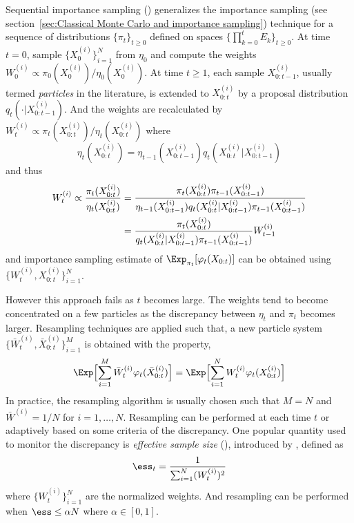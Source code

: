 Sequential importance sampling (\sis) generalizes the importance sampling (see
section~\ref{sec:Classical Monte Carlo and importance sampling}) technique for
a sequence of distributions $\{\pi_t\}_{t\ge0}$ defined on spaces
$\{\prod_{k=0}^tE_k\}_{t\ge0}$. At time $t = 0$, sample
$\{X_0^{(i)}\}_{i=1}^N$ from $\eta_0$ and compute the weights $W_0^{(i)}
\propto \pi_0(X_0^{(i)})/\eta_0(X_0^{(i)})$. At time $t\ge1$, each sample
$X_{0:t-1}^{(i)}$, usually termed \emph{particles} in the literature, is
extended to $X_{0:t}^{(i)}$ by a proposal distribution
$q_t(\cdot|X_{0:t-1}^{(i)})$. And the weights are recalculated by $W_t^{(i)}
\propto \pi_t(X_{0:t}^{(i)})/\eta_t(X_{0:t}^{(i)})$ where
\begin{equation}
  \eta_t(X_{0:t}^{(i)}) =
  \eta_{t-1}(X_{0:t-1}^{(i)})q_t(X_{0:t}^{(i)}|X_{0:t-1}^{(i)})
\end{equation}
and thus
\begin{align}
  W_t^{(i)} \propto \frac{\pi_t(X_{0:t}^{(i)})}{\eta_t(X_{0:t}^{(i)})}
  &= \frac{\pi_t(X_{0:t}^{(i)})\pi_{t-1}(X_{0:t-1}^{(i)})}
  {\eta_{t-1}(X_{0:t-1}^{(i)})q_t(X_{0:t}^{(i)}|X_{0:t-1}^{(i)})
    \pi_{t-1}(X_{0:t-1}^{(i)})} \notag\\
  &= \frac{\pi_t(X_{0:t}^{(i)})}
  {q_t(X_{0:t}^{(i)}|X_{0:t-1}^{(i)})\pi_{t-1}(X_{0:t-1}^{(i)})}W_{t-1}^{(i)}
  \label{eq:si}
\end{align}
and importance sampling estimate of $\Exp_{\pi_t}[\varphi_t(X_{0:t})]$ can be
obtained using $\{W_t^{(i)},X_{0:t}^{(i)}\}_{i=1}^N$.

However this approach fails as $t$ becomes large. The weights tend to become
concentrated on a few particles as the discrepancy between $\eta_t$ and
$\pi_t$ becomes larger. Resampling techniques are applied such that, a new
particle system $\{\bar{W}_t^{(i)},\bar{X}_{0:t}^{(i)}\}_{i=1}^M$ is obtained
with the property,
\begin{equation}
  \Exp\Bigl[\sum_{i=1}^M\bar{W}_t^{(i)}\varphi_t(\bar{X}_{0:t}^{(i)})\Bigr] =
  \Exp\Bigl[\sum_{i=1}^NW_t^{(i)}\varphi_t(X_{0:t}^{(i)})\Bigr]
  \label{eq:resample}
\end{equation}
In practice, the resampling algorithm is usually chosen such that $M = N$ and
$\bar{W}^{(i)} = 1/N$ for $i=1,\dots,N$. Resampling can be performed at each time
$t$ or adaptively based on some criteria of the discrepancy. One popular
quantity used to monitor the discrepancy is \emph{effective sample size}
(\ess), introduced by \cite{Liu:1998iu}, defined as
\begin{equation}
  \ess_t = \frac{1}{\sum_{i=1}^N (W_t^{(i)})^2}
\end{equation}
where $\{W_t^{(i)}\}_{i=1}^N$ are the normalized weights. And resampling can
be performed when $\ess\le \alpha N$ where $\alpha\in[0,1]$.

